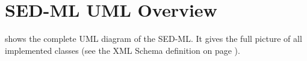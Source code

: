 \chapter{SED-ML UML Overview}
 shows the complete UML diagram of the SED-ML. It gives the full picture of all implemented classes (see the XML Schema definition on page \pageref{lst:schema}).
\label{app:uml}

